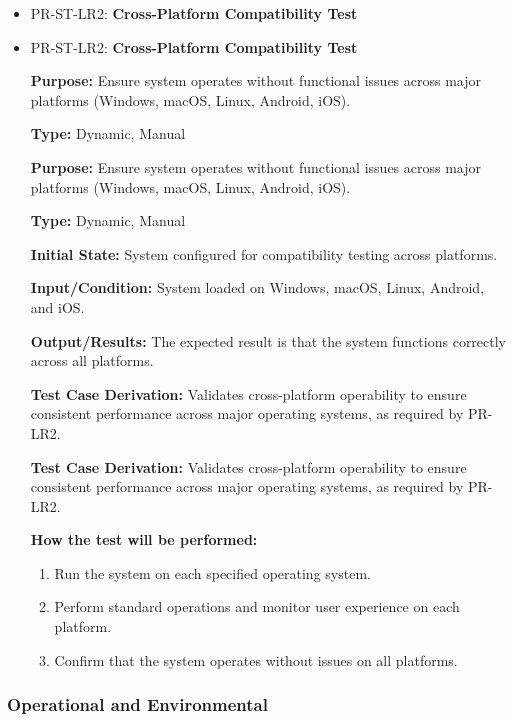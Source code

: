 \documentclass[12pt, titlepage]{article}
\begin{document}
\begin{itemize}
\item PR-ST-LR2: \textbf{Cross-Platform Compatibility Test}

\item PR-ST-LR2: \textbf{Cross-Platform Compatibility Test}
  \begin{mdframed}[linewidth=0.5mm]
      \textbf{Purpose:} Ensure system operates without functional issues across major platforms (Windows, macOS, Linux, Android, iOS). \par
      \textbf{Type:} Dynamic, Manual \par
      \textbf{Purpose:} Ensure system operates without functional issues across major platforms (Windows, macOS, Linux, Android, iOS). \par
      \textbf{Type:} Dynamic, Manual \par
      \textbf{Initial State:} System configured for compatibility testing across platforms. \par
      \textbf{Input/Condition:} System loaded on Windows, macOS, Linux, Android, and iOS. \par
      \textbf{Output/Results:} The expected result is that the system functions correctly across all platforms. \par
      \textbf{Test Case Derivation:} Validates cross-platform operability to ensure consistent performance across major operating systems, as required by PR-LR2. \par
      \textbf{Test Case Derivation:} Validates cross-platform operability to ensure consistent performance across major operating systems, as required by PR-LR2. \par
      \textbf{How the test will be performed:}
      \begin{enumerate}[noitemsep]
        \item Run the system on each specified operating system.
        \item Perform standard operations and monitor user experience on each platform.
        \item Confirm that the system operates without issues on all platforms.
      \end{enumerate}
  \end{mdframed}
\end{itemize}

\subsubsection{Operational and Environmental}
\end{document}
